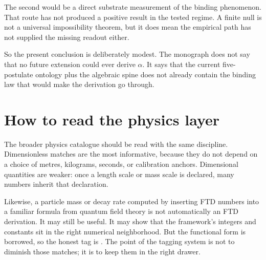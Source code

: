 \medskip
\noindent The second would be a direct substrate measurement of the binding
phenomenon. That route has not produced a positive result in the tested regime.
A finite null is not a universal impossibility theorem, but it does mean the
empirical path has not supplied the missing readout either.

\medskip
\noindent So the present conclusion is deliberately modest. The monograph does
not say that no future extension could ever derive $\alpha$. It says that the
current five-postulate ontology plus the algebraic spine does not already contain
the binding law that would make the derivation go through.

\section*{How to read the physics layer}

\noindent The broader physics catalogue should be read with the same discipline.
Dimensionless matches are the most informative, because they do not depend on a
choice of metres, kilograms, seconds, or calibration anchors. Dimensional
quantities are weaker: once a length scale or mass scale is declared, many
numbers inherit that declaration.

\medskip
\noindent Likewise, a particle mass or decay rate computed by inserting FTD
numbers into a familiar formula from quantum field theory is not automatically an
FTD derivation. It may still be useful. It may show that the framework's
integers and constants sit in the right numerical neighborhood. But the
functional form is borrowed, so the honest tag is . The point of the
tagging system is not to diminish those matches; it is to keep them in the
right drawer.

